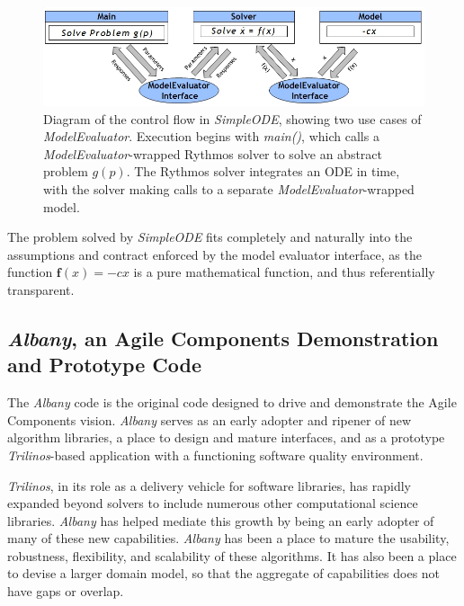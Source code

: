 \documentclass[10pt]{article}
\theoremstyle{plain}
\theoremstyle{definition}
\theoremstyle{remark}
\numberwithin{equation}{section}
\begin{document}
\begin{figure}[h!]
\begin{center}
	\includegraphics[width=\linewidth]{SimpleODEInterface}
 \end{center}
 \caption{Diagram of the control flow in \emph{SimpleODE}, showing two use cases of \emph{ModelEvaluator}. Execution begins with \emph{main()}, which calls a \emph{ModelEvaluator}-wrapped Rythmos solver to solve an abstract problem $g(p)$. The Rythmos solver integrates an ODE in time, with the solver making calls to a separate \emph{ModelEvaluator}-wrapped model.}
\label{fig:SimpleODEInterface}
\end{figure}

The problem solved by \emph{SimpleODE} fits completely and naturally into the assumptions and contract enforced by the model evaluator interface, as the function $\mathbf{f}(x) = -c x$ is a pure mathematical function, and thus referentially transparent.

\subsection{\emph{Albany}, an Agile Components Demonstration and Prototype Code} \label{sec:albany}

The \emph{Albany} code \cite{AlbanyWebPage:2011} is the original code designed to drive and demonstrate the Agile Components vision. \emph{Albany} serves as an early adopter and ripener of new algorithm libraries, a place to design and mature interfaces, and as a prototype \emph{Trilinos}-based application with a functioning software quality environment.

\emph{Trilinos}, in its role as a delivery vehicle for software libraries, has rapidly expanded beyond solvers to include numerous other computational science libraries. \emph{Albany} has helped mediate this growth by being an early adopter of many of these new capabilities. \emph{Albany} has been a place to mature the usability, robustness, flexibility, and scalability of these algorithms. It has also been a place to devise a larger domain model, so that the aggregate of capabilities does not have gaps or overlap.
\end{document}
